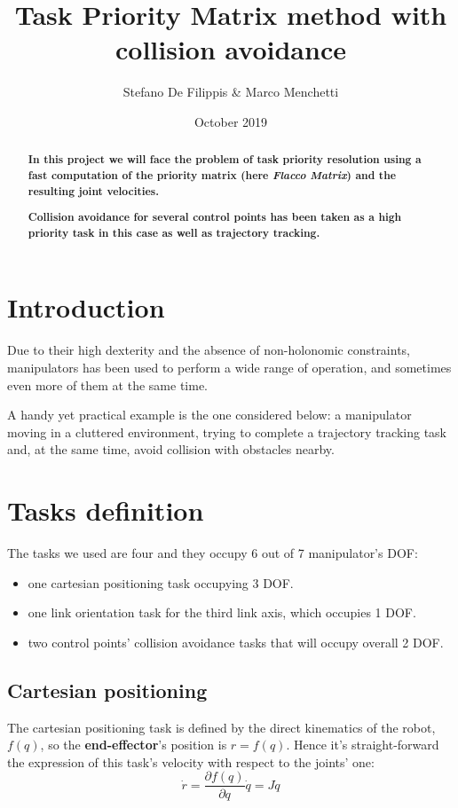 \documentclass[12pt, a4paper]{article}
\newcommand{\diff}[2]{\frac{\partial{#1}}{\partial{#2}}}
\begin{document}
	
	\title{Task Priority Matrix method with collision avoidance}
	\author{Stefano De Filippis \& Marco Menchetti}
	\date{October 2019}
	\maketitle
	
	\newpage
	\tableofcontents
	
\begin{abstract}
	\textbf{
	In this project we will face the problem of task priority resolution using a fast computation of the priority matrix (here \textit{Flacco Matrix}) and the resulting joint velocities.}

\textbf{
	Collision avoidance for several control points has been taken as a high priority task in this case as well as trajectory tracking.}
\end{abstract}
\section*{Introduction}
Due to their high dexterity and the absence of non-holonomic constraints, manipulators has been used to perform a wide range of operation, and sometimes even more of them at the same time.

A handy yet practical example is the one considered below: a manipulator moving in a cluttered environment, trying to complete a trajectory tracking task and, at the same time, avoid collision with obstacles nearby.

\section{Tasks definition}
The tasks we used are four and they occupy 6 out of 7 manipulator's DOF:
\begin{itemize}
	\item one cartesian positioning task occupying 3 DOF.
	\item one link orientation task for the third link axis, which occupies 1 DOF.
	\item two control points' collision avoidance tasks that will occupy overall 2 DOF.
\end{itemize}
\subsection[Task 1]{Cartesian positioning}
The cartesian positioning task is defined by the direct kinematics of the robot, $f(q)$, so the \textbf{end-effector}'s position is $r = f(q)$. Hence it's straight-forward the expression of this task's velocity with respect to the joints' one: 
\begin{equation}
\label{EQN: task1}
 \dot{r} = \diff{f(q)}{q} \dot{q} = J\dot{q}
\end{equation}
\end{document}
